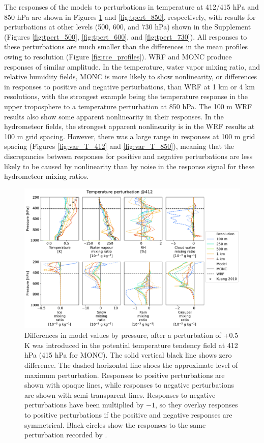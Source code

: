 \documentclass[draft]{agujournal2019}
\begin{document}
The responses of the models to perturbations in temperature at 412/415 hPa and
850 hPa are shown in Figures \ref{fig:tpert_412} and \ref{fig:tpert_850},
respectively, with results for perturbations at other levels (500, 600, and 730
hPa) shown in the Supplement (Figures \ref{fig:tpert_500}, \ref{fig:tpert_600},
and \ref{fig:tpert_730}). All responses to these perturbations are much smaller
than the differences in the mean profiles owing to resolution (Figure
\ref{fig:rce_profiles}). WRF and MONC produce responses of similar amplitude. In
the temperature, water vapor mixing ratio, and relative humidity fields, MONC is
more likely to show nonlinearity, or differences in responses to positive and
negative perturbations, than WRF at 1 km or 4 km resolutions, with the strongest
example being the temperature response in the upper troposphere to a temperature
perturbation at 850 hPa. The 100 m WRF results also show some apparent
nonlinearity in their responses. In the hydrometeor fields, the strongest
apparent nonlinearity is in the WRF results at 100 m grid spacing. However,
there was a large range in responses at 100 m grid spacing (Figures
\ref{fig:var_T_412} and \ref{fig:var_T_850}), meaning that the discrepancies
between responses for positive and negative perturbations are less likely to be
caused by nonlinearity than by noise in the response signal for these
hydrometeor mixing ratios.

\begin{figure}[pth]
    \noindent\includegraphics[width=\textwidth]{figures/pert_diffs_T_0.5_@412}
    \caption{Differences in model values by pressure, after a perturbation of
    +0.5 K was introduced in the potential temperature tendency field at 412 hPa
    (415 hPa for MONC). The solid vertical black line shows zero difference. The
    dashed horizontal line shoes the approximate level of maximum perturbation.
    Responses to positive perturbations are shown with opaque lines, while
    responses to negative perturbations are shown with semi-transparent lines.
    Responses to negative perturbations have been multiplied by $-1$, so they
    overlay responses to positive perturbations if the positive and negative
    responses are symmetrical. Black circles show the responses to the same
    perturbation recorded by .}
    \label{fig:tpert_412}
\end{figure}
\end{document}
